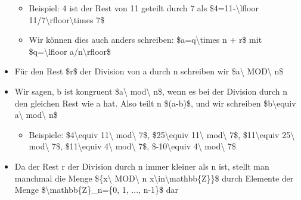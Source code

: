 \documentclass[a4paper]{article}
\begin{document}
\begin{multicols}{3}
\begin{itemize}
              \begin{itemize}
                  \item
                        Beispiel: 4 ist der Rest von 11 geteilt durch 7 als
                        \$4=11-\textbackslash lfloor
                        11/7\textbackslash rfloor\textbackslash times 7\$
                  \item
                        Wir können dies auch anders schreiben: \$a=q\textbackslash times n +
                        r\$ mit \$q=\textbackslash lfloor a/n\textbackslash rfloor\$
              \end{itemize}
        \item
              Für den Rest \$r\$ der Division von a durch n schreiben wir
              \$a\textbackslash{} MOD\textbackslash{} n\$
        \item
              Wir sagen, b ist kongruent \$a\textbackslash{} mod\textbackslash{}
              n\$, wenn es bei der Division durch n den gleichen Rest wie a hat.
              Also teilt n \$(a-b)\$, und wir schreiben \$b\textbackslash equiv
              a\textbackslash{} mod\textbackslash{} n\$

              \begin{itemize}
                  \item
                        Beispiele: \$4\textbackslash equiv 11\textbackslash{}
                        mod\textbackslash{} 7\$, \$25\textbackslash equiv 11\textbackslash{}
                        mod\textbackslash{} 7\$, \$11\textbackslash equiv 25\textbackslash{}
                        mod\textbackslash{} 7\$, \$11\textbackslash equiv 4\textbackslash{}
                        mod\textbackslash{} 7\$, \$-10\textbackslash equiv 4\textbackslash{}
                        mod\textbackslash{} 7\$
              \end{itemize}
        \item
              Da der Rest r der Division durch n immer kleiner als n ist, stellt man
              manchmal die Menge \$\{x\textbackslash{} MOD\textbackslash{} n
              \textbar{} x\textbackslash in\textbackslash mathbb\{Z\}\}\$ durch
              Elemente der Menge \$\textbackslash mathbb\{Z\}\_n=\{0, 1, ...,
              n-1\}\$ dar
    \end{itemize}


\end{multicols}
\end{document}
